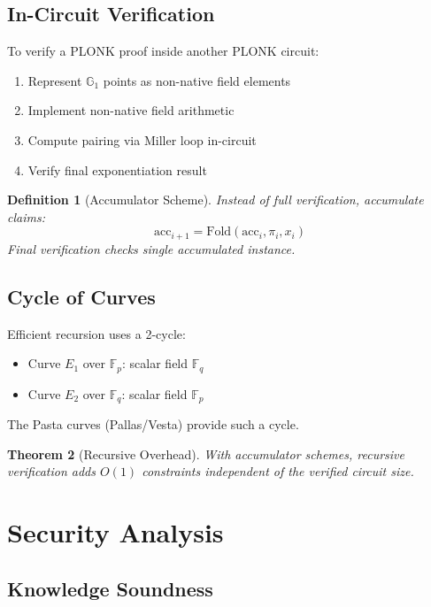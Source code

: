 \documentclass[11pt,a4paper]{article}
\newtheorem{theorem}{Theorem}[section]
\newtheorem{definition}[theorem]{Definition}
\newcommand{\F}{\mathbb{F}}
\newcommand{\G}{\mathbb{G}}
\begin{document}
\subsection{In-Circuit Verification}

To verify a PLONK proof inside another PLONK circuit:

\begin{enumerate}[label=(\roman*)]
    \item Represent $\G_1$ points as non-native field elements
    \item Implement non-native field arithmetic
    \item Compute pairing via Miller loop in-circuit
    \item Verify final exponentiation result
\end{enumerate}

\begin{definition}[Accumulator Scheme]
Instead of full verification, accumulate claims:
\[
\text{acc}_{i+1} = \text{Fold}(\text{acc}_i, \pi_i, x_i)
\]
Final verification checks single accumulated instance.
\end{definition}

\subsection{Cycle of Curves}

Efficient recursion uses a 2-cycle:
\begin{itemize}
    \item Curve $E_1$ over $\F_p$: scalar field $\F_q$
    \item Curve $E_2$ over $\F_q$: scalar field $\F_p$
\end{itemize}

The Pasta curves (Pallas/Vesta) provide such a cycle.

\begin{theorem}[Recursive Overhead]
With accumulator schemes, recursive verification adds $O(1)$ constraints independent of the verified circuit size.
\end{theorem}

\section{Security Analysis}

\subsection{Knowledge Soundness}
\end{document}
